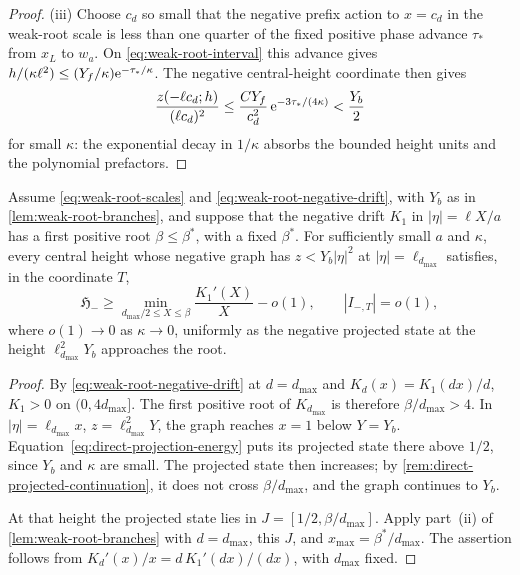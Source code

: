 \begin{proof}
(iii) Choose \(c_d\) so small that the negative prefix action to
\(x=c_d\) in the weak-root scale is less than one quarter of the fixed
positive phase advance \(\tau_*\) from \(x_L\) to \(w_a\). On
\eqref{eq:weak-root-interval} this advance gives
\(h/(\kappa\ell^2)\le(Y_f/\kappa)\mathrm e^{-\tau_*/\kappa}\). The negative
central-height coordinate then gives
\[
 \frac{z(-\ell c_d;h)}{(\ell c_d)^2}
 \le\frac{CY_f}{c_d^2}\,\mathrm e^{-3\tau_*/(4\kappa)}
 <\frac{Y_b}{2}
\]
for small \(\kappa\): the exponential decay in \(1/\kappa\) absorbs the
bounded height units and the polynomial prefactors.
\end{proof}

\begin{corollary}
\label{cor:weak-root-negative-first-root}
Assume \eqref{eq:weak-root-scales} and \eqref{eq:weak-root-negative-drift},
with \(Y_b\) as in \cref{lem:weak-root-branches}, and suppose that the
negative drift \(K_1\) in \(|\eta|=\ell X/a\) has a first positive root
\(\beta\le\beta^*\), with a fixed \(\beta^*\). For sufficiently small \(a\)
and \(\kappa\), every central height whose negative graph has
\(z<Y_b|\eta|^2\) at \(|\eta|=\ell_{d_{\max}}\) satisfies, in the
coordinate \(T\),
\[
 \mathfrak H_-\ge\min_{d_{\max}/2\le X\le\beta}\frac{K_1'(X)}X-o(1),
 \qquad |I_{-,T}|=o(1),
\]
where \(o(1)\to0\) as \(\kappa\to0\), uniformly as the negative projected
state at the height \(\ell_{d_{\max}}^2Y_b\) approaches the root.
\end{corollary}

\begin{proof}
By \eqref{eq:weak-root-negative-drift} at \(d=d_{\max}\) and
\(K_d(x)=K_1(dx)/d\), \(K_1>0\) on \((0,4d_{\max}]\).
The first positive root of \(K_{d_{\max}}\) is therefore
\(\beta/d_{\max}>4\). In \(|\eta|=\ell_{d_{\max}}x\),
\(z=\ell_{d_{\max}}^2Y\), the graph reaches \(x=1\) below
\(Y=Y_b\). Equation~\eqref{eq:direct-projection-energy} puts its
projected state there above \(1/2\), since \(Y_b\) and \(\kappa\)
are small. The projected state then increases; by
\cref{rem:direct-projected-continuation}, it does not cross
\(\beta/d_{\max}\), and the graph continues to \(Y_b\).

At that height the projected state lies in
\(J=[1/2,\beta/d_{\max}]\). Apply part~(ii) of
\cref{lem:weak-root-branches} with \(d=d_{\max}\), this \(J\), and
\(x_{\max}=\beta^*/d_{\max}\). The assertion follows from
\(K_d'(x)/x=d\,K_1'(dx)/(dx)\), with \(d_{\max}\) fixed.
\end{proof}


